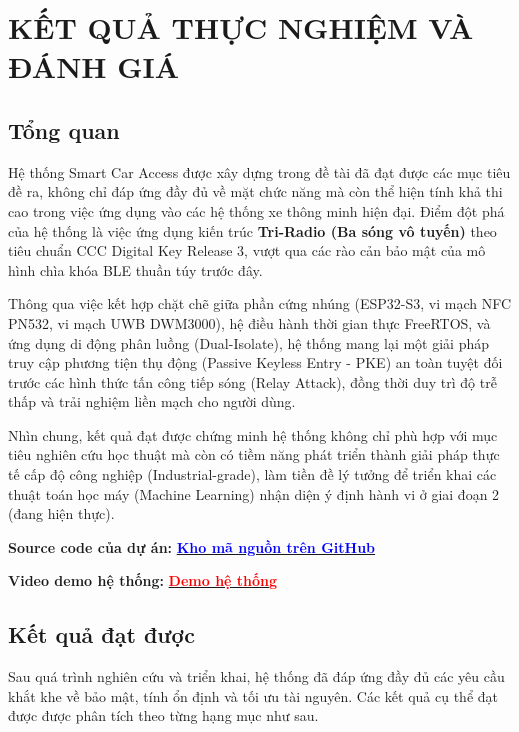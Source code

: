 \newpage
\chapter{\MakeUppercase{KẾT QUẢ THỰC NGHIỆM VÀ ĐÁNH GIÁ}}
\section{Tổng quan}

Hệ thống Smart Car Access được xây dựng trong đề tài đã đạt được các mục tiêu đề ra, không chỉ đáp ứng đầy đủ về mặt chức năng mà còn thể hiện tính khả thi cao trong việc ứng dụng vào các hệ thống xe thông minh hiện đại. Điểm đột phá của hệ thống là việc ứng dụng kiến trúc \textbf{Tri-Radio (Ba sóng vô tuyến)} theo tiêu chuẩn CCC Digital Key Release 3, vượt qua các rào cản bảo mật của mô hình chìa khóa BLE thuần túy trước đây.

Thông qua việc kết hợp chặt chẽ giữa phần cứng nhúng (ESP32-S3, vi mạch NFC PN532, vi mạch UWB DWM3000), hệ điều hành thời gian thực FreeRTOS, và ứng dụng di động phân luồng (Dual-Isolate), hệ thống mang lại một giải pháp truy cập phương tiện thụ động (Passive Keyless Entry - PKE) an toàn tuyệt đối trước các hình thức tấn công tiếp sóng (Relay Attack), đồng thời duy trì độ trễ thấp và trải nghiệm liền mạch cho người dùng.

Nhìn chung, kết quả đạt được chứng minh hệ thống không chỉ phù hợp với mục tiêu nghiên cứu học thuật mà còn có tiềm năng phát triển thành giải pháp thực tế cấp độ công nghiệp (Industrial-grade), làm tiền đề lý tưởng để triển khai các thuật toán học máy (Machine Learning) nhận diện ý định hành vi ở giai đoạn 2 (đang hiện thực).

\par\noindent
\textbf{Source code của dự án:} 
\href{https://github.com/NhanVo-tech/Thesis.git}{\textcolor{blue}{\textbf{Kho mã nguồn trên GitHub}}}

\par\noindent
\textbf{Video demo hệ thống:} 
\href{https://drive.google.com/drive/folders/1kUymyDruULcvT3Kjg8Sff-fCjvxDySlZ?usp=drive_link}{\textcolor{red}{\textbf{Demo hệ thống}}}

\section{Kết quả đạt được}

Sau quá trình nghiên cứu và triển khai, hệ thống đã đáp ứng đầy đủ các yêu cầu khắt khe về bảo mật, tính ổn định và tối ưu tài nguyên. Các kết quả cụ thể đạt được được phân tích theo từng hạng mục như sau.

